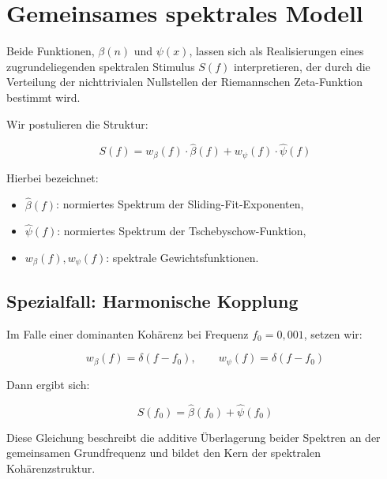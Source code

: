 \section{Gemeinsames spektrales Modell}

Beide Funktionen, $\beta(n)$ und $\psi(x)$, lassen sich als Realisierungen eines zugrundeliegenden spektralen Stimulus $S(f)$ interpretieren, der durch die Verteilung der nichttrivialen Nullstellen der Riemannschen Zeta-Funktion bestimmt wird.

Wir postulieren die Struktur:

\begin{equation}
S(f) = w_\beta(f) \cdot \widehat{\beta}(f) + w_\psi(f) \cdot \widehat{\psi}(f)
\end{equation}

Hierbei bezeichnet:
\begin{itemize}
  \item $\widehat{\beta}(f)$: normiertes Spektrum der Sliding-Fit-Exponenten,
  \item $\widehat{\psi}(f)$: normiertes Spektrum der Tschebyschow-Funktion,
  \item $w_\beta(f), w_\psi(f)$: spektrale Gewichtsfunktionen.
\end{itemize}

\subsection*{Spezialfall: Harmonische Kopplung}

Im Falle einer dominanten Kohärenz bei Frequenz $f_0 = 0{,}001$, setzen wir:

\begin{equation}
w_\beta(f) = \delta(f - f_0), \qquad w_\psi(f) = \delta(f - f_0)
\end{equation}

Dann ergibt sich:

\begin{equation}
S(f_0) = \widehat{\beta}(f_0) + \widehat{\psi}(f_0)
\end{equation}

Diese Gleichung beschreibt die additive Überlagerung beider Spektren an der gemeinsamen Grundfrequenz und bildet den Kern der spektralen Kohärenzstruktur.